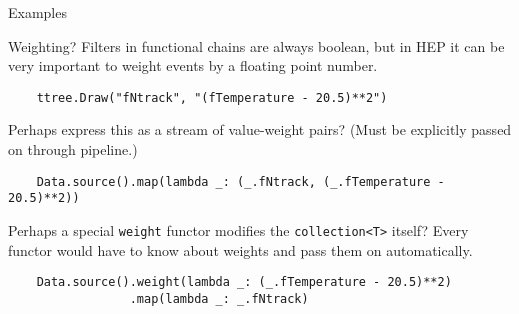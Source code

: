 \documentclass{beamer}
\begin{document}
\begin{frame}[fragile]{Examples}
\begin{block}{Weighting?}
Filters in functional chains are always boolean, but in HEP it can be very important to weight events by a floating point number.

{\scriptsize \begin{verbatim}
    ttree.Draw("fNtrack", "(fTemperature - 20.5)**2")
\end{verbatim}}

Perhaps express this as a stream of value-weight pairs? (Must be explicitly passed on through pipeline.)

{\scriptsize \begin{verbatim}
    Data.source().map(lambda _: (_.fNtrack, (_.fTemperature - 20.5)**2))
\end{verbatim}}

Perhaps a special {\tt weight} functor modifies the {\tt collection<T>} itself? Every functor would have to know about weights and pass them on automatically.

{\scriptsize \begin{verbatim}
    Data.source().weight(lambda _: (_.fTemperature - 20.5)**2)
                 .map(lambda _: _.fNtrack)
\end{verbatim}}
\end{block}
\end{frame}
\end{document}
